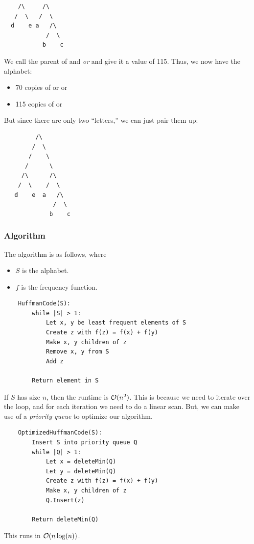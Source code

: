 \documentclass[letterpaper]{article}
\begin{document}
\begin{verbatim}
    /\     /\ 
   /  \   /  \ 
  d    e a   /\ 
            /  \ 
           b    c
\end{verbatim}
We call the parent of  and  \emph{ or } and give it a value of 115. Thus, we now have the alphabet:
\begin{itemize}
    \item 70 copies of  or  or 
    \item 115 copies of  or 
\end{itemize}
But since there are only two ``letters,'' we can just pair them up: 
\begin{verbatim}
         /\ 
        /  \
       /    \ 
      /      \
     /\      /\ 
    /  \    /  \ 
   d    e  a   /\ 
              /  \ 
             b    c
\end{verbatim}

\subsubsection{Algorithm}
The algorithm is as follows, where 
\begin{itemize}
    \item $S$ is the alphabet. 
    \item $f$ is the frequency function. 
\end{itemize}

\begin{verbatim}
    HuffmanCode(S):
        while |S| > 1:
            Let x, y be least frequent elements of S 
            Create z with f(z) = f(x) + f(y)
            Make x, y children of z 
            Remove x, y from S 
            Add z 

        Return element in S 
\end{verbatim}

If $S$ has size $n$, then the runtime is $\mathcal{O}(n^2)$. This is because we need to iterate over the  loop, and for each iteration we need to do a linear scan. But, we can make use of a \emph{priority queue} to optimize our algorithm.

\begin{verbatim}
    OptimizedHuffmanCode(S):
        Insert S into priority queue Q 
        while |Q| > 1:
            Let x = deleteMin(Q)
            Let y = deleteMin(Q)
            Create z with f(z) = f(x) + f(y)
            Make x, y children of z 
            Q.Insert(z)

        Return deleteMin(Q) 
\end{verbatim}
This runs in $\mathcal{O}(n\log(n))$. 
\end{document}
